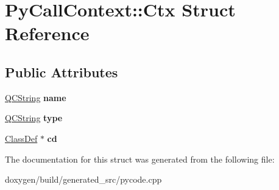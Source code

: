 \hypertarget{struct_py_call_context_1_1_ctx}{}\section{Py\+Call\+Context\+::Ctx Struct Reference}
\label{struct_py_call_context_1_1_ctx}
\subsection*{Public Attributes}
\begin{DoxyCompactItemize}
\item 
\mbox{\label{struct_py_call_context_1_1_ctx_a71f14a5904a47903b8ea2804d7a49b70}} 
\mbox{\hyperlink{class_q_c_string}{Q\+C\+String}} {\bfseries name}
\item 
\mbox{\label{struct_py_call_context_1_1_ctx_a2fdc3acb8e79d8e4053f9aa4168b7465}} 
\mbox{\hyperlink{class_q_c_string}{Q\+C\+String}} {\bfseries type}
\item 
\mbox{\label{struct_py_call_context_1_1_ctx_a58636a7a4ef3e0038834b1ee34a5d8f9}} 
\mbox{\hyperlink{class_class_def}{Class\+Def}} $\ast$ {\bfseries cd}
\end{DoxyCompactItemize}


The documentation for this struct was generated from the following file\+:\begin{DoxyCompactItemize}
\item 
doxygen/build/generated\+\_\+src/pycode.\+cpp\end{DoxyCompactItemize}
